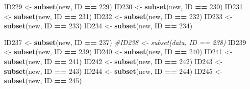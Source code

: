 \documentclass[
]{book}
\newenvironment{Shaded}{\begin{snugshade}}{\end{snugshade}}
\newcommand{\CommentTok}[1]{\textcolor[rgb]{0.56,0.35,0.01}{\textit{#1}}}
\newcommand{\DecValTok}[1]{\textcolor[rgb]{0.00,0.00,0.81}{#1}}
\newcommand{\KeywordTok}[1]{\textcolor[rgb]{0.13,0.29,0.53}{\textbf{#1}}}
\newcommand{\NormalTok}[1]{#1}
\newcommand{\OperatorTok}[1]{\textcolor[rgb]{0.81,0.36,0.00}{\textbf{#1}}}
\newcommand{\StringTok}[1]{\textcolor[rgb]{0.31,0.60,0.02}{#1}}
\begin{document}
\begin{Shaded}
\begin{Highlighting}[]
{{{{{{\NormalTok{ID229 <-}\StringTok{ }\KeywordTok{subset}\NormalTok{(new, ID }\OperatorTok{==}\StringTok{ }\DecValTok{229}\NormalTok{)}
\NormalTok{ID230 <-}\StringTok{ }\KeywordTok{subset}\NormalTok{(new, ID }\OperatorTok{==}\StringTok{ }\DecValTok{230}\NormalTok{)}
\NormalTok{ID231 <-}\StringTok{ }\KeywordTok{subset}\NormalTok{(new, ID }\OperatorTok{==}\StringTok{ }\DecValTok{231}\NormalTok{)}
\NormalTok{ID232 <-}\StringTok{ }\KeywordTok{subset}\NormalTok{(new, ID }\OperatorTok{==}\StringTok{ }\DecValTok{232}\NormalTok{)}
\NormalTok{ID233 <-}\StringTok{ }\KeywordTok{subset}\NormalTok{(new, ID }\OperatorTok{==}\StringTok{ }\DecValTok{233}\NormalTok{)}
\NormalTok{ID234 <-}\StringTok{ }\KeywordTok{subset}\NormalTok{(new, ID }\OperatorTok{==}\StringTok{ }\DecValTok{234}\NormalTok{)}

\NormalTok{ID237 <-}\StringTok{ }\KeywordTok{subset}\NormalTok{(new, ID }\OperatorTok{==}\StringTok{ }\DecValTok{237}\NormalTok{)}
\CommentTok{#ID238 <- subset(data, ID == 238)}
\NormalTok{ID239 <-}\StringTok{ }\KeywordTok{subset}\NormalTok{(new, ID }\OperatorTok{==}\StringTok{ }\DecValTok{239}\NormalTok{)}
\NormalTok{ID240 <-}\StringTok{ }\KeywordTok{subset}\NormalTok{(new, ID }\OperatorTok{==}\StringTok{ }\DecValTok{240}\NormalTok{)}
\NormalTok{ID241 <-}\StringTok{ }\KeywordTok{subset}\NormalTok{(new, ID }\OperatorTok{==}\StringTok{ }\DecValTok{241}\NormalTok{)}
\NormalTok{ID242 <-}\StringTok{ }\KeywordTok{subset}\NormalTok{(new, ID }\OperatorTok{==}\StringTok{ }\DecValTok{242}\NormalTok{)}
\NormalTok{ID243 <-}\StringTok{ }\KeywordTok{subset}\NormalTok{(new, ID }\OperatorTok{==}\StringTok{ }\DecValTok{243}\NormalTok{)}
\NormalTok{ID244 <-}\StringTok{ }\KeywordTok{subset}\NormalTok{(new, ID }\OperatorTok{==}\StringTok{ }\DecValTok{244}\NormalTok{)}
\NormalTok{ID245 <-}\StringTok{ }\KeywordTok{subset}\NormalTok{(new, ID }\OperatorTok{==}\StringTok{ }\DecValTok{245}\NormalTok{)}

}}}}}}
\end{Highlighting}
\end{Shaded}
\end{document}

